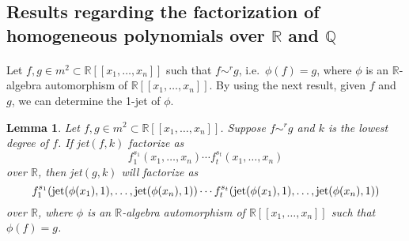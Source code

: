 \documentclass{amsproc}
\begin{document}
\subsection{Results regarding the factorization of homogeneous polynomials over $\mathbb R$ and $\mathbb Q$}
\paragraph{}Let $f,g\in m^2\subset\mathbb R[[x_1,\ldots,x_n]]$ such that $f\sim^r g$, i.e.~$\phi(f)=g$, where $\phi$ is an $\mathbb R$-algebra automorphism of  $\mathbb R[[x_1,\ldots,x_n]]$. By using the next result, given $f$ and $g$, we can determine the 1-jet of $\phi$. 
\newtheorem{kjet}{Lemma}[section]
\begin{kjet}\label{kjet}
Let $f,g\in m^2\subset\mathbb R[[x_1,\ldots,x_n]]$. Suppose $f\sim^r g$ and $k$ is the lowest degree of $f$. If jet$(f,k)$ factorize as \[f_1^{s_1}(x_1,\ldots,x_n)\cdots f_t^{s_t}(x_1,\ldots,x_n)\] over $\mathbb R$, then jet$(g,k)$ will factorize as \[f_1^{s_1} (\textnormal{jet}(\phi(x_1),1),\ldots,\textnormal{jet}(\phi(x_n),1))\cdots f_t^{s_t}(\textnormal{jet}(\phi(x_1),1),\ldots,\textnormal{jet}(\phi(x_n),1))\] over $\mathbb R$, where $\phi$ is an $\mathbb R$-algebra automorphism of $\mathbb R[[x_1,\ldots,x_n]]$ such that $\phi(f)=g$. 
\end{kjet}
\end{document}
